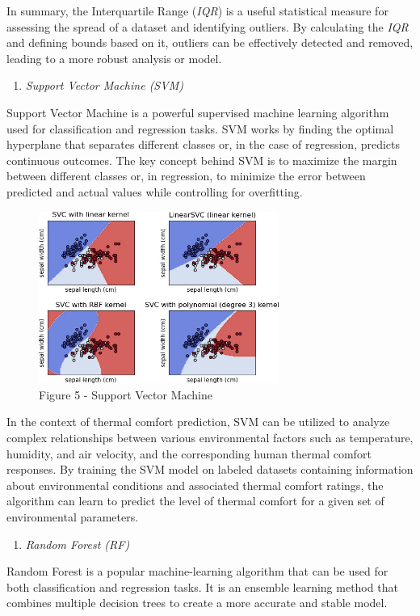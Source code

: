\begin{multicols}{2}
In summary, the Interquartile Range (\emph{IQR}) is a useful statistical
measure for assessing the spread of a dataset and identifying outliers.
By calculating the \emph{IQR} and defining bounds based on it, outliers
can be effectively detected and removed, leading to a more robust
analysis or model.

\begin{enumerate}[leftmargin=*]
\def\labelenumi{\Alph{enumi}.}
\setcounter{enumi}{5}
\item
  \emph{Support Vector Machine (SVM)}
\end{enumerate}

Support Vector Machine is a powerful supervised machine learning
algorithm used for classification and regression tasks. SVM works by
finding the optimal hyperplane that separates different classes or, in
the case of regression, predicts continuous outcomes. The key concept
behind SVM is to maximize the margin between different classes or, in
regression, to minimize the error between predicted and actual values
while controlling for overfitting.
\end{multicols}

\begin{figure}[H]
	\centering
	\includegraphics[width=0.7\textwidth]{media/ict/image21}
	\caption*{Figure 5 - Support Vector Machine}
\end{figure}

\begin{multicols}{2}
In the context of thermal comfort prediction, SVM can be utilized to
analyze complex relationships between various environmental factors such
as temperature, humidity, and air velocity, and the corresponding human
thermal comfort responses. By training the SVM model on labeled datasets
containing information about environmental conditions and associated
thermal comfort ratings, the algorithm can learn to predict the level of
thermal comfort for a given set of environmental parameters.

\begin{enumerate}[leftmargin=*]
\def\labelenumi{\Alph{enumi}.}
\setcounter{enumi}{6}
\item
  \emph{Random Forest (RF)}
\end{enumerate}

Random Forest is a popular machine-learning algorithm that can be used
for both classification and regression tasks. It is an ensemble learning
method that combines multiple decision trees to create a more accurate
and stable model.
\end{multicols}

